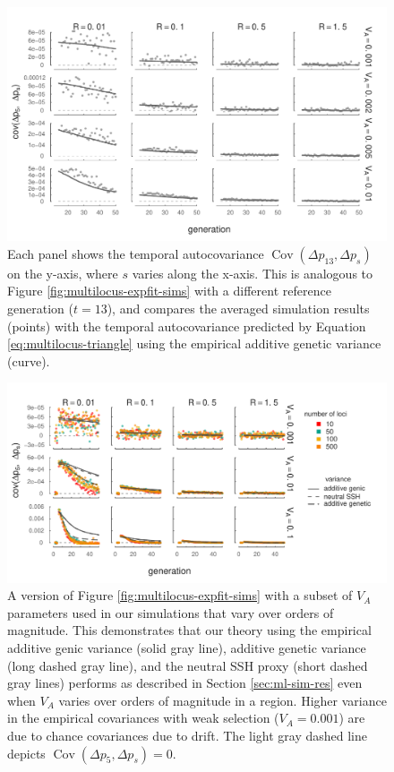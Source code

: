 \documentclass[11pt]{article}
\DeclareMathOperator{\cov}{Cov}
\begin{document}
\begin{figure}[!ht]
  \centering
  \includegraphics{./images/sim-pred13-covs-varyl.pdf}

  \caption{Each panel shows the temporal autocovariance $\cov(\Delta p_{13},
    \Delta p_s)$ on the y-axis, where $s$ varies along the x-axis. This is
    analogous to Figure \ref{fig:multilocus-expfit-sims} with a different
    reference generation ($t=13$), and compares the averaged simulation results
  (points) with the temporal autocovariance predicted by Equation
\eqref{eq:multilocus-triangle} using the empirical additive genetic variance
(curve). }

\label{fig:multilocus-expfit-sims-gen13} 
\end{figure}


\begin{figure}[!ht]
  \centering
  \includegraphics{./images/sim-pred-covs-varyl-va-oom.pdf}

  \caption{A version of Figure \ref{fig:multilocus-expfit-sims} with a subset
    of $V_A$ parameters used in our simulations that vary over orders of
    magnitude. This demonstrates that our theory using the empirical additive
    genic variance (solid gray line), additive genetic variance (long dashed
    gray line), and the neutral SSH proxy (short dashed gray lines) performs as
    described in Section \ref{sec:ml-sim-res} even when $V_A$ varies over
    orders of magnitude in a region. Higher variance in the empirical
    covariances with weak selection ($V_A = 0.001$) are due to chance covariances
    due to drift. The light gray dashed line depicts $\cov(\Delta p_5, \Delta p_s) =
  0$.}
  

  \label{fig:multilocus-expfit-sims-va-oom}
\end{figure}
\end{document}
